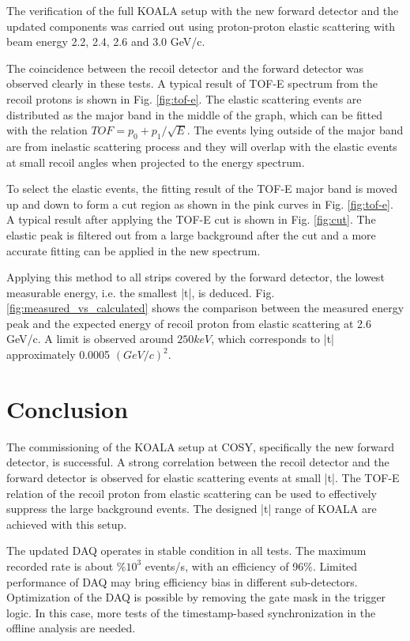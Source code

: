 \documentclass[number]{elsarticle}
\begin{document}
The verification of the full KOALA setup with the new forward detector and the updated components was carried out using proton-proton elastic scattering with beam energy
2.2, 2.4, 2.6 and 3.0 GeV/c.

The coincidence between the recoil detector and the forward detector was observed clearly in these tests.
A typical result of TOF-E spectrum from the recoil protons is shown in Fig. \ref{fig:tof-e}. 
The elastic scattering events are distributed as the major band in the middle of the graph, which can be fitted with the relation \(TOF = p_{0} + p_{1}/{\sqrt{E}}\).
The events lying outside of the major band are from inelastic scattering process and they will overlap with the elastic events at small recoil angles when projected to the energy spectrum.

To select the elastic events, the fitting result of the TOF-E major band is moved up and down to form a cut region as shown in the pink curves in Fig. \ref{fig:tof-e}.
A typical result after applying the TOF-E cut is shown in Fig. \ref{fig:cut}.
The elastic peak is filtered out from a large background after the cut and a more accurate fitting can be applied in the new spectrum.

Applying this method to all strips covered by the forward detector, the lowest measurable energy, i.e. the smallest |t|, is deduced.
Fig. \ref{fig:measured_vs_calculated} shows the comparison between the measured energy peak and the expected energy of recoil proton from elastic scattering at 2.6 GeV/c.
A limit is observed around \(250 keV\), which corresponds to |t| approximately 0.0005 \((GeV/c)^2\).

\section{Conclusion}
\label{sec:conclusion}

The commissioning of the KOALA setup at COSY, specifically the new forward detector, is successful.
A strong correlation between the recoil detector and the forward detector is observed for elastic scattering events at small |t|.
The TOF-E relation of the recoil proton from elastic scattering can be used to effectively suppress the large background events.
The designed |t| range of KOALA are achieved with this setup.

The updated DAQ operates in stable condition in all tests.
The maximum recorded rate is about $\%10^3$ events/s, with an efficiency of 96\%.
Limited performance of DAQ may bring efficiency bias in different sub-detectors.
Optimization of the DAQ is possible by removing the gate mask in the trigger logic.
In this case, more tests of the timestamp-based synchronization in the offline analysis are needed.



\end{document}
